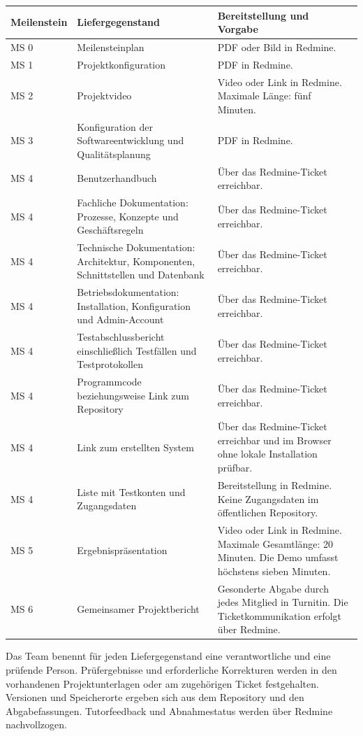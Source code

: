 \documentclass[11pt,a4paper]{article}
\begin{document}
\begin{tabularx}{\linewidth}{@{}l p{5.2cm} Y@{}}
\toprule
\textbf{Meilenstein} & \textbf{Liefergegenstand} & \textbf{Bereitstellung und Vorgabe} \\
\midrule
\endhead
MS 0 & Meilensteinplan & PDF oder Bild in Redmine. \\
MS 1 & Projektkonfiguration & PDF in Redmine. \\
MS 2 & Projektvideo & Video oder Link in Redmine. Maximale Länge: fünf Minuten. \\
MS 3 & Konfiguration der Softwareentwicklung und Qualitätsplanung & PDF in Redmine. \\
MS 4 & Benutzerhandbuch & Über das Redmine-Ticket erreichbar. \\
MS 4 & Fachliche Dokumentation: Prozesse, Konzepte und Geschäftsregeln & Über das Redmine-Ticket erreichbar. \\
MS 4 & Technische Dokumentation: Architektur, Komponenten, Schnittstellen und Datenbank & Über das Redmine-Ticket erreichbar. \\
MS 4 & Betriebsdokumentation: Installation, Konfiguration und Admin-Account & Über das Redmine-Ticket erreichbar. \\
MS 4 & Testabschlussbericht einschließlich Testfällen und Testprotokollen & Über das Redmine-Ticket erreichbar. \\
MS 4 & Programmcode beziehungsweise Link zum Repository & Über das Redmine-Ticket erreichbar. \\
MS 4 & Link zum erstellten System & Über das Redmine-Ticket erreichbar und im Browser ohne lokale Installation prüfbar. \\
MS 4 & Liste mit Testkonten und Zugangsdaten & Bereitstellung in Redmine. Keine Zugangsdaten im öffentlichen Repository. \\
MS 5 & Ergebnispräsentation & Video oder Link in Redmine. Maximale Gesamtlänge: 20 Minuten. Die Demo umfasst höchstens sieben Minuten. \\
MS 6 & Gemeinsamer Projektbericht & Gesonderte Abgabe durch jedes Mitglied in Turnitin. Die Ticketkommunikation erfolgt über Redmine. \\
\bottomrule
\end{tabularx}

Das Team benennt für jeden Liefergegenstand eine verantwortliche und eine prüfende Person. Prüf\-ergebnisse und erforderliche Korrekturen werden in den vorhandenen Projektunterlagen oder am zugehörigen Ticket festgehalten. Versionen und Speicherorte ergeben sich aus dem Repository und den Abgabefassungen. Tutorfeedback und Abnahmestatus werden über Redmine nachvollzogen.
\end{document}
